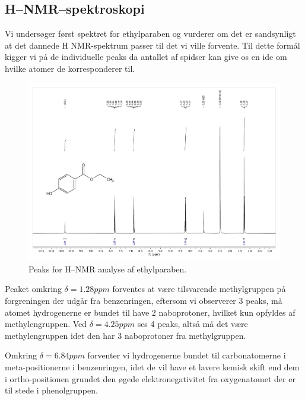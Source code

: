     \subsection{H--NMR--spektroskopi}
    Vi undersøger først spektret for ethylparaben og vurderer om det er sandsynligt at det dannede H NMR-spektrum passer til det vi ville forvente. Til dette formål kigger vi på de individuelle peaks da antallet af spidser kan give os en ide om hvilke atomer de korresponderer til.
    \begin{figure}[H] \centering
        \includegraphics[width=\textwidth,page=2]{bilag/ethylnmr}
        \caption{Peaks for H--NMR analyse af ethylparaben.}
    \end{figure} 
    Peaket omkring $\delta=1.28\si{ppm}$ forventes at være tilsvarende methylgruppen på forgreningen der udgår fra benzenringen, eftersom vi observerer 3 peaks, må atomet hydrogenerne er bundet til have 2 naboprotoner, hvilket kun opfyldes af methylengruppen. Ved $\delta=4.25\si{ppm}$ ses 4 peaks, altså må det være methylengruppen idet den har 3 naboprotoner fra methylgruppen. 
    
    Omkring $\delta=6.84\si{ppm}$ forventer vi hydrogenerne bundet til carbonatomerne i meta-positionerne i benzenringen, idet de vil have et lavere kemisk skift end dem i ortho-positionen grundet den øgede elektronegativitet fra oxygenatomet der er til stede i phenolgruppen. 
    
